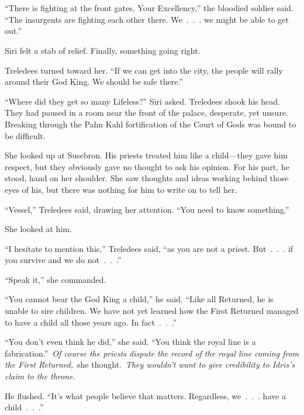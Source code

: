 \chapter{}

“There is fighting at the front gates, Your Excellency,” the bloodied soldier said. “The insurgents are fighting each other there. We~.~.~. we might be able to get out.”

Siri felt a stab of relief. Finally, something going right.

Treledees turned toward her. “If we can get into the city, the people will rally around their God King. We should be safe there.”

“Where did they get so many Lifeless?” Siri asked. Treledees shook his head. They had paused in a room near the front of the palace, desperate, yet unsure. Breaking through the Pahn Kahl fortification of the Court of Gods was bound to be difficult.

She looked up at Susebron. His priests treated him like a child—they gave him respect, but they obviously gave no thought to ask his opinion. For his part, he stood, hand on her shoulder. She saw thoughts and ideas working behind those eyes of his, but there was nothing for him to write on to tell her.

“Vessel,” Treledees said, drawing her attention. “You need to know something.”

She looked at him.

“I hesitate to mention this,” Treledees said, “as you are not a priest. But~.~.~. if you survive and we do not~.~.~.”

“Speak it,” she commanded.

“You cannot bear the God King a child,” he said. “Like all Returned, he is unable to sire children. We have not yet learned how the First Returned managed to have a child all those years ago. In fact~.~.~.”

“You don’t even think he did,” she said. “You think the royal line is a fabrication.”~\textit{Of course the priests dispute the record of the royal line coming from the First Returned,}~she thought.~\textit{They wouldn’t want to give credibility to Idris’s claim to the throne.}

He flushed. “It’s what people believe that matters. Regardless, we~.~.~. have a child~.~.~.”

